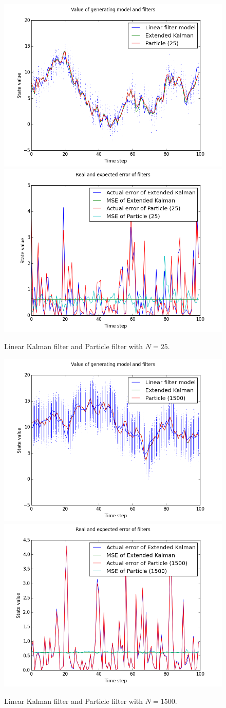 \documentclass[paper=a4, fontsize=11pt]{scrartcl} %
\numberwithin{equation}{section} %
\numberwithin{figure}{section} %
\numberwithin{table}{section} %
\begin{document}
\begin{figure}
\centerline{
\includegraphics[width=.7\textwidth]{fig/figure_1}
\includegraphics[width=.7\textwidth]{fig/figure_2}}
\caption{Linear Kalman filter and Particle filter with $N=25$.}\label{fig:1}
\end{figure}
\begin{figure}
\centerline{
\includegraphics[width=.7\textwidth]{fig/figure_3}
\includegraphics[width=.7\textwidth]{fig/figure_4}}
\caption{Linear Kalman filter and Particle filter with $N=1500$.}\label{fig:2}
\end{figure}
\end{document}
